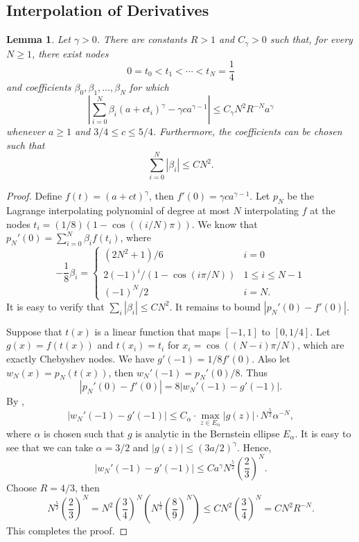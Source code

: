 \documentclass[11pt]{article}
\newtheorem{lemma}[theorem]{Lemma}
\theoremstyle{remark}
\theoremstyle{definition}
\begin{document}
\subsection{Interpolation of Derivatives}\label{sec:diff_interpolation}
\begin{lemma}
	Let $\gamma > 0$. There are constants $R > 1$ and $C_\gamma > 0$ such that, for every $N\geq 1$, there exist nodes
	\[
		0 = t_0 < t_1 < \cdots < t_N = \frac{1}{4}
	\]
	and coefficients $\beta_0,\beta_1,\dots,\beta_N$ for which
	\[
		\left| \sum_{i=0}^N \beta_i (a + ct_i)^\gamma - \gamma c a^{\gamma-1} \right| \leq C_\gamma N^2 R^{-N} a^\gamma
	\]
	whenever $a\geq 1$ and $3/4 \leq c \leq 5/4$. Furthermore, the coefficients can be chosen such that
	\[
		\sum_{i=0}^N |\beta_i| \leq C N^2.
	\]
\end{lemma}
\begin{proof}
	Define $f(t) = (a + ct)^\gamma$, then $f'(0) = \gamma c a^{\gamma-1}$. Let $p_N$ be the Lagrange interpolating polynomial of degree at most $N$ interpolating $f$ at the nodes $t_i = (1/8)(1-\cos((i/N)\pi))$. We know that $p_N'(0) = \sum_{i=0}^N \beta_i f(t_i)$, where
	\[
		-\frac{1}{8}\beta_i = 
		\begin{cases}
			(2N^2+1)/6 & i = 0\\
			2(-1)^i/(1-\cos(i\pi/N)) & 1\leq i\leq N-1 \\
			(-1)^N/2 & i=N.
		\end{cases}
	\]
	It is easy to verify that $\sum_i |\beta_i| \leq CN^2$. It remains to bound $|p_N'(0) - f'(0)|$. 
	
	Suppose that $t(x)$ is a linear function that maps $[-1,1]$ to $[0,1/4]$. Let $g(x) = f(t(x))$ and $t(x_i) = t_i$ for $x_i = \cos((N-i)\pi/N)$, which are exactly Chebyshev nodes. We have $g'(-1) = 1/8 f'(0)$. Also let $w_N(x) = p_N(t(x))$, then $w_N'(-1) = p_N'(0)/8$. Thus
	\[
		|p_N'(0) - f'(0)| = 8|w_N'(-1) - g'(-1)|.
	\]
	 By \cite[Corollary 4.6]{tadmor}, 
	 \[
	 	|w_N'(-1) - g'(-1)| \leq C_\alpha \cdot \max_{z\in E_\alpha} |g(z)| \cdot N^{\frac{5}{2}} \alpha^{-N},
	 \]
	 where $\alpha$ is chosen such that $g$ is analytic in the Bernstein ellipse $E_\alpha$. It is easy to see that we can take $\alpha = 3/2$ and $|g(z)|\leq (3a/2)^\gamma$. Hence,
	 \[
	 	|w_N'(-1) - g'(-1)| \leq C a^\gamma N^{\frac{5}{2}} \left(\frac{2}{3}\right)^N.
	 \]
	 Choose $R = 4/3$, then
	 \[
	 	N^{\frac{5}{2}} \left(\frac{2}{3}\right)^N = N^2 \left(\frac{3}{4}\right)^N \left( N^{\frac{1}{2}} \left(\frac{8}{9}\right)^N \right) \leq C N^2 \left(\frac{3}{4}\right)^N = C N^2 R^{-N}.
	 \]
	 This completes the proof.
\end{proof}
\end{document}
